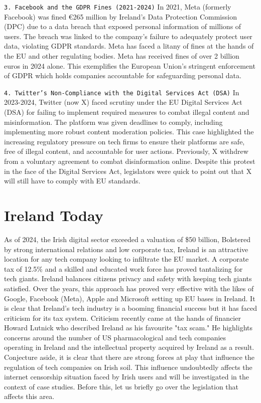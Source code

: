 \texttt{3. Facebook and the GDPR Fines (2021-2024)}
In 2021, Meta (formerly Facebook) was fined €265 million by Ireland's Data Protection Commission (DPC) due to a data breach that exposed personal information of millions of users. \cite{facebook2023} The breach was linked to the company's failure to adequately protect user data, violating GDPR standards. Meta has faced a litany of fines at the hands of the EU and other regulating bodies. Meta has received fines of over 2 billion euros in 2024 alone. \cite{FBFines} This exemplifies the European Union's stringent enforcement of GDPR which holds companies accountable for safeguarding personal data. 



\texttt{4. Twitter's Non-Compliance with the Digital Services Act (DSA)}
In 2023-2024, Twitter (now X) faced scrutiny under the EU Digital Services Act (DSA) for failing to implement required measures to combat illegal content and misinformation. \cite{twitter2023} The platform was given deadlines to comply, including implementing more robust content moderation policies. This case highlighted the increasing regulatory pressure on tech firms to ensure their platforms are safe, free of illegal content, and accountable for user actions. Previously, X withdrew from a voluntary agreement to combat disinformation online. Despite this protest in the face of the Digital Services Act, legislators were quick to point out that X will still have to comply with EU standards. \cite{bhr2023}



\section{Ireland Today}
As of 2024, the Irish digital sector exceeded a valuation of \$50 billion, \cite{tradegov2025} Bolstered by strong international relations and low corporate tax, Ireland is an attractive location for any tech company looking to infiltrate the EU market. A corporate tax of 12.5\% \cite{revenueie2025} and a skilled and educated work force has proved tantalizing for tech giants. Ireland balances citizens privacy and safety with keeping tech giants satisfied. Over the years, this approach has proved very effective with the likes of Google, Facebook (Meta), Apple and Microsoft setting up EU bases in Ireland. It is clear that Ireland's tech industry is a booming financial success but it has faced criticism for its tax system. Criticism recently came at the hands of financier Howard Lutnick who described Ireland as his favourite "tax scam." \cite{archyde2025} He highlights concerns around the number of US pharmacological and tech companies operating in Ireland and the intellectual property acquired by Ireland as a result. Conjecture aside, it is clear that there are strong forces at play that influence the regulation of tech companies on Irish soil. This influence undoubtedly affects the internet censorship situation faced by Irish users and will be investigated in the context of case studies. Before this, let us briefly go over the legislation that affects this area. 

